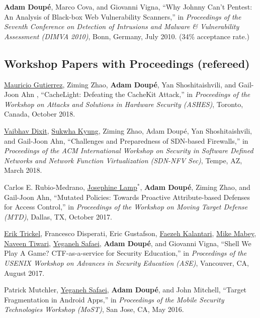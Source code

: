 \documentclass[11pt,letterpaper,sans]{moderncv}
\begin{document}
\begin{etaremune}
\item \textbf{Adam Doup\'e}, Marco Cova, and Giovanni Vigna, ``Why
  Johnny Can't Pentest: An Analysis of Black-box Web Vulnerability
  Scanners,'' in \emph{Proceedings of the Seventh Conference on
    Detection of Intrusions and Malware \& Vulnerability Assessment
    (DIMVA 2010)}, Bonn, Germany, July 2010. (34\% acceptance rate.)
  
\end{etaremune}

\subsection{Workshop Papers with Proceedings (refereed)}

\begin{etaremune}

\item \underline{Mauricio Gutierrez}, Ziming Zhao, \textbf{Adam Doup\'e}, Yan Shoshitaishvili, and Gail-Joon Ahn , ``CacheLight: Defeating the CacheKit Attack,'' in \emph{Proceedings of the Workshop on Attacks and Solutions in Hardware Security (ASHES)}, Toronto, Canada, October 2018.

\item \underline{Vaibhav Dixit}, \underline{Sukwha Kyung}, Ziming
  Zhao, Adam Doupé, Yan Shoshitaishvili, and Gail-Joon Ahn,
  ``Challenges and Preparedness of SDN-based Firewalls,'' in
  \emph{Proceedings of the ACM International Workshop on Security in
    Software Defined Networks and Network Function Virtualization
    (SDN-NFV Sec)}, Tempe, AZ, March 2018. 

\item Carlos E. Rubio-Medrano, \underline{Josephine Lamp}$^*$, \textbf{Adam
  Doup\'e}, Ziming Zhao, and Gail-Joon Ahn, ``Mutated Policies: Towards
  Proactive Attribute-based Defenses for Access Control,'' in
  \emph{Proceedings of the Workshop on Moving Target Defense (MTD)},
  Dallas, TX, October 2017. 

\item \underline{Erik Trickel}, Francesco Disperati, Eric Gustafson,
  \underline{Faezeh Kalantari}, \underline{Mike Mabey},
  \underline{Naveen Tiwari}, \underline{Yeganeh Safaei}, \textbf{Adam
    Doup\'e}, and Giovanni Vigna, ``Shell We Play A Game?
  CTF-as-a-service for Security Education,'' in \emph{Proceedings of
    the USENIX Workshop on Advances in Security Education (ASE)},
  Vancouver, CA, August 2017.
      
\item Patrick Mutchler, \underline{Yeganeh Safaei}, \textbf{Adam
  Doup\'e}, and John Mitchell, ``Target Fragmentation in Android
  Apps,'' in \emph{Proceedings of the Mobile Security Technologies
    Workshop (MoST)}, San Jose, CA, May 2016.


\end{etaremune}
\end{document}
